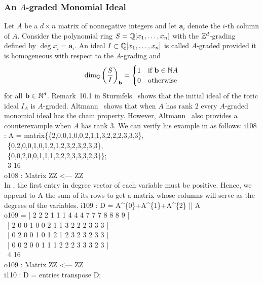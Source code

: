 \subsubsection*{An $A$-graded Monomial Ideal}  Let $A$ be a $d \times n$ matrix
of nonnegative integers and let $\mathbf{a}_{i}$ denote the $i$-th
column of $A$.  Consider the polynomial ring $S = {\mathbb Q}[x_{1}, \dotsc,
x_{n}]$ with the ${\mathbb Z}^{d}$-grading defined by $\deg x_{i} =
\mathbf{a}_{i}$.  An ideal $I \subset {\mathbb Q}[x_{1}, \dotsc, x_{n}]$ is
called $A$-graded provided it is homogeneous with
respect to the $A$-grading and
\[
\dim_{{\mathbb Q}} \left( \frac{S}{I} \right)_{\mathbf{b}} = \begin{cases} 1
& \text{if $\mathbf{b} \in {\mathbb N} A$} \\ 0 & \text{otherwise}
\end{cases}
\]
for all $\mathbf{b} \in {\mathbb N}^{d}$.  Remark~10.1 in
Sturmfels~\cite{MR97b:13034} shows that the initial ideal of the toric
ideal $I_{A}$ is $A$-graded.  Altmann~\cite{Altmann} shows that when
$A$ has rank $2$ every $A$-graded monomial ideal has the chain
property.  However, Altmann~\cite{Altmann} also provides a
counterexample when $A$ has rank $3$.  We can verify his example in
\Mtwo as follows:
\beginOutput
i108 : A = matrix\{\{2,0,0,1,0,0,2,1,1,3,2,2,2,3,3,3\},\\
\                  \{0,2,0,0,1,0,1,2,1,2,3,2,3,2,3,3\},\\
\                  \{0,0,2,0,0,1,1,1,2,2,2,3,3,3,2,3\}\};\\
\emptyLine
\                3        16\\
o108 : Matrix ZZ  <--- ZZ\\
\endOutput
In \Mtwo, the first entry in degree vector of each variable must be
positive.  Hence, we append to A the sum of its rows to get a matrix whose
columns will serve as the degrees of the variables.
\beginOutput
i109 : D = A^\{0\}+A^\{1\}+A^\{2\} || A\\
\emptyLine
o109 = | 2 2 2 1 1 1 4 4 4 7 7 7 8 8 8 9 |\\
\       | 2 0 0 1 0 0 2 1 1 3 2 2 2 3 3 3 |\\
\       | 0 2 0 0 1 0 1 2 1 2 3 2 3 2 3 3 |\\
\       | 0 0 2 0 0 1 1 1 2 2 2 3 3 3 2 3 |\\
\emptyLine
\                4        16\\
o109 : Matrix ZZ  <--- ZZ\\
\endOutput
\beginOutput
i110 : D = entries transpose D;\\
